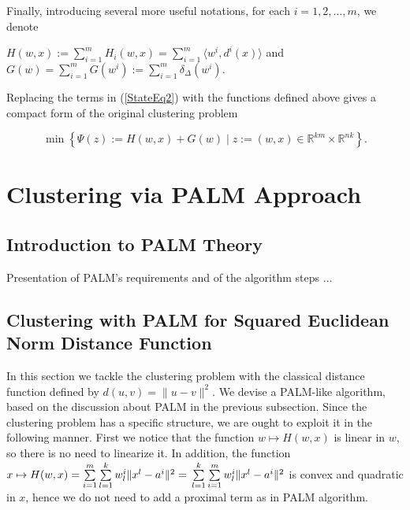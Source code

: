 \documentclass[11pt]{article}
\numberwithin{equation}{section}
\begin{document}
Finally, introducing several more useful notations, for each $i=1, 2, \ldots , m$, we denote
\begin{center}
$H(w,x) := \sum\limits_{i=1}^{m} H_i(w,x) = \sum\limits_{i=1}^{m} \langle w^i , d^i(x) \rangle$ and $G(w) = \sum\limits_{i=1}^{m} G(w^i) := \sum\limits_{i=1}^{m} \delta_{\Delta}(w^i) .$
\\
\end{center}

Replacing the terms in (\ref{StateEq2}) with the functions defined above gives a compact form of the original clustering problem

\begin{equation}
	\min \left\lbrace \Psi(z) := H(w,x) + G(w) \mid z := (w,x) \in \mathbb{R}^{km} \times \mathbb{R}^{nk} \right\rbrace . \label{StateEq4}
\end{equation}


\section{Clustering via PALM Approach}

\subsection{Introduction to PALM Theory}

Presentation of PALM's requirements and of the algorithm steps  $\ldots$


\subsection{Clustering with PALM for Squared Euclidean Norm Distance Function}

In this section we tackle the clustering problem with the classical distance function defined by $d(u,v) = \|u-v\|^2$. We devise a PALM-like algorithm, based on the discussion about PALM in the previous subsection.
Since the clustering problem has a specific structure, we are ought to exploit it in the following manner.
First we notice that the function 
$w \mapsto H(w,x)$ is linear in $w$, so there is no need to linearize it. In addition, the function 
$x \mapsto H(w,x) = 
\sum\limits_{i=1}^{m} \sum\limits_{l=1}^{k} w^i_l \|x^l - a^i\|^2 =
\\ \sum\limits_{l=1}^{k} \sum\limits_{i=1}^{m} w^i_l \|x^l - a^i\|^2$ is convex and quadratic in $x$, hence we do not need to add a proximal term as in PALM algorithm.
\end{document}
